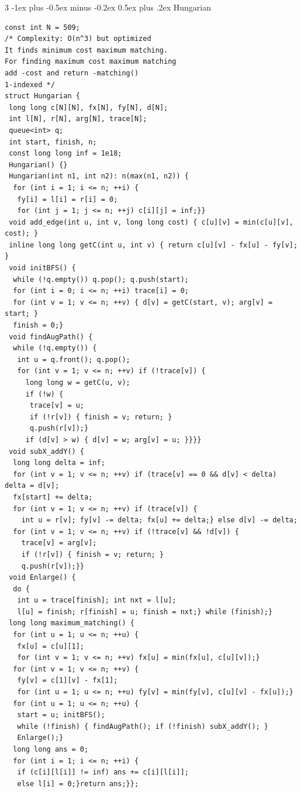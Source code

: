 \documentclass[8pt,a4paper,onesided]{article}
\makeatletter
\renewcommand{\subsection}{\@startsection{subsection}{2}{0mm}
    {-1ex plus -0.5ex minus -0.2ex} %
    {0.5ex plus .2ex}                %
    {\normalfont\large\bfseries}}    %
\makeatother
\begin{document}
\begin{multicols}{3}
\subsection{Hungarian}
\begin{verbatim}
const int N = 509;
/* Complexity: O(n^3) but optimized
It finds minimum cost maximum matching.
For finding maximum cost maximum matching
add -cost and return -matching()
1-indexed */
struct Hungarian {
 long long c[N][N], fx[N], fy[N], d[N];
 int l[N], r[N], arg[N], trace[N];
 queue<int> q;
 int start, finish, n;
 const long long inf = 1e18;
 Hungarian() {}
 Hungarian(int n1, int n2): n(max(n1, n2)) {
  for (int i = 1; i <= n; ++i) {
   fy[i] = l[i] = r[i] = 0;
   for (int j = 1; j <= n; ++j) c[i][j] = inf;}}
 void add_edge(int u, int v, long long cost) { c[u][v] = min(c[u][v], cost); }
 inline long long getC(int u, int v) { return c[u][v] - fx[u] - fy[v]; }
 void initBFS() {
  while (!q.empty()) q.pop(); q.push(start);
  for (int i = 0; i <= n; ++i) trace[i] = 0;
  for (int v = 1; v <= n; ++v) { d[v] = getC(start, v); arg[v] = start; }
  finish = 0;}
 void findAugPath() {
  while (!q.empty()) {
   int u = q.front(); q.pop();
   for (int v = 1; v <= n; ++v) if (!trace[v]) {
     long long w = getC(u, v);
     if (!w) {
      trace[v] = u;
      if (!r[v]) { finish = v; return; }
      q.push(r[v]);}
     if (d[v] > w) { d[v] = w; arg[v] = u; }}}}
 void subX_addY() {
  long long delta = inf;
  for (int v = 1; v <= n; ++v) if (trace[v] == 0 && d[v] < delta) delta = d[v];
  fx[start] += delta;
  for (int v = 1; v <= n; ++v) if (trace[v]) {
    int u = r[v]; fy[v] -= delta; fx[u] += delta;} else d[v] -= delta;
  for (int v = 1; v <= n; ++v) if (!trace[v] && !d[v]) {
    trace[v] = arg[v];
    if (!r[v]) { finish = v; return; }
    q.push(r[v]);}}
 void Enlarge() {
  do {
   int u = trace[finish]; int nxt = l[u];
   l[u] = finish; r[finish] = u; finish = nxt;} while (finish);}
 long long maximum_matching() {
  for (int u = 1; u <= n; ++u) {
   fx[u] = c[u][1];
   for (int v = 1; v <= n; ++v) fx[u] = min(fx[u], c[u][v]);}
  for (int v = 1; v <= n; ++v) {
   fy[v] = c[1][v] - fx[1];
   for (int u = 1; u <= n; ++u) fy[v] = min(fy[v], c[u][v] - fx[u]);}
  for (int u = 1; u <= n; ++u) {
   start = u; initBFS();
   while (!finish) { findAugPath(); if (!finish) subX_addY(); }
   Enlarge();}
  long long ans = 0;
  for (int i = 1; i <= n; ++i) {
   if (c[i][l[i]] != inf) ans += c[i][l[i]];
   else l[i] = 0;}return ans;}};
\end{verbatim}

\end{multicols}
\end{document}
